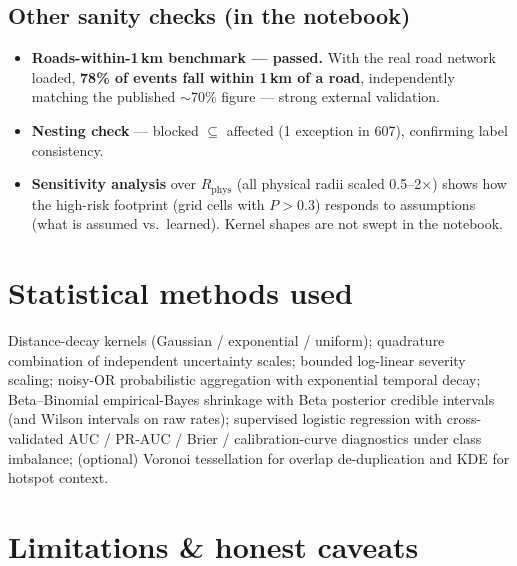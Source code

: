 \documentclass[11pt,a4paper]{article}
\newcommand{\Rphys}{R_{\mathrm{phys}}}
\begin{document}
\subsection{Other sanity checks (in the notebook)}
\begin{itemize}[nosep,leftmargin=1.4em]
  \item \textbf{Roads-within-1\,km benchmark --- passed.} With the real road network loaded,
        \textbf{78\% of events fall within 1\,km of a road}, independently matching the
        published $\sim$70\% figure --- strong external validation.
  \item \textbf{Nesting check} --- blocked $\subseteq$ affected (1 exception in 607), confirming
        label consistency.
  \item \textbf{Sensitivity analysis} over $\Rphys$ (all physical radii scaled 0.5--2$\times$)
        shows how the high-risk footprint (grid cells with $P>0.3$) responds to assumptions
        (what is assumed vs.\ learned). Kernel shapes are not swept in the notebook.
\end{itemize}

\section{Statistical methods used}

Distance-decay kernels (Gaussian / exponential / uniform); quadrature combination of
independent uncertainty scales; bounded log-linear severity scaling; noisy-OR probabilistic
aggregation with exponential temporal decay; Beta--Binomial empirical-Bayes shrinkage with Beta
posterior credible intervals (and Wilson intervals on raw rates); supervised logistic regression
with cross-validated AUC / PR-AUC / Brier / calibration-curve diagnostics under class imbalance;
(optional) Voronoi tessellation for overlap de-duplication and KDE for hotspot context.

\section{Limitations \& honest caveats}
\end{document}
